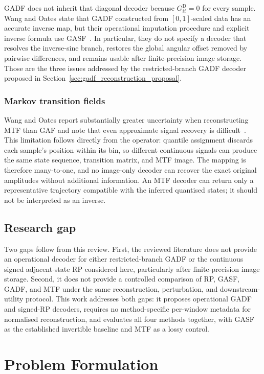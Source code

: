 \documentclass[5p]{elsarticle}
\begin{document}
GADF does not inherit that diagonal decoder because \(G^{\mathrm{D}}_{ii}=0\) for every sample. Wang and Oates state that GADF constructed from \([0,1]\)-scaled data has an accurate inverse map, but their operational imputation procedure and explicit inverse formula use GASF~\cite{wang2015encoding}. In particular, they do not specify a decoder that resolves the inverse-sine branch, restores the global angular offset removed by pairwise differences, and remains usable after finite-precision image storage. Those are the three issues addressed by the restricted-branch GADF decoder proposed in Section~\ref{sec:gadf_reconstruction_proposal}.

\subsubsection{Markov transition fields}

Wang and Oates report substantially greater uncertainty when reconstructing MTF than GAF and note that even approximate signal recovery is difficult~\cite{wang2015encoding}. This limitation follows directly from the operator: quantile assignment discards each sample's position within its bin, so different continuous signals can produce the same state sequence, transition matrix, and MTF image. The mapping is therefore many-to-one, and no image-only decoder can recover the exact original amplitudes without additional information. An MTF decoder can return only a representative trajectory compatible with the inferred quantised states; it should not be interpreted as an inverse.


\subsection{Research gap}\label{sec:research_gap}
Two gaps follow from this review. First, the reviewed literature does not provide an operational decoder for either restricted-branch GADF or the continuous signed adjacent-state RP considered here, particularly after finite-precision image storage. Second, it does not provide a controlled comparison of RP, GASF, GADF, and MTF under the same reconstruction, perturbation, and downstream-utility protocol. This work addresses both gaps: it proposes operational GADF and signed-RP decoders, requires no method-specific per-window metadata for normalised reconstruction, and evaluates all four methods together, with GASF as the established invertible baseline and MTF as a lossy control.

\section{Problem Formulation}\label{sec:problem_formulation}
\end{document}
